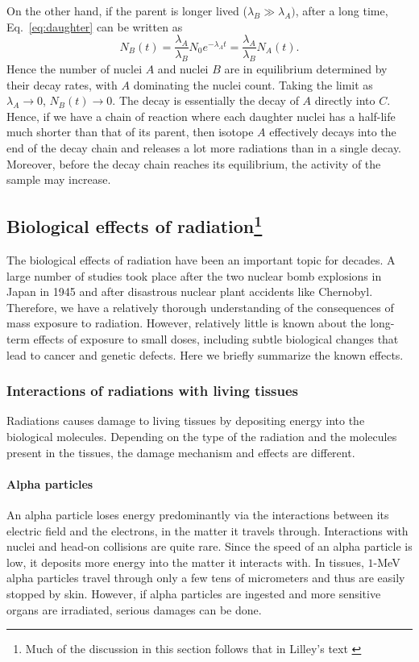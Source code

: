 \documentclass[nofootinbib,preprint,aps]{revtex4-1}
\begin{document}
        On the other hand, if the parent is longer lived
        ($\lambda_B \gg \lambda_A)$, after a long time, Eq.~\ref{eq:daughter} can be written as
        \begin{equation}
            N_B(t)=\frac{\lambda_A}{\lambda_B}N_0 e^{-\lambda_A t}=\frac{\lambda_A}{\lambda_B}N_A(t).
        \end{equation}
        Hence the number of nuclei $A$ and nuclei $B$ are in equilibrium determined by their decay rates, with
        $A$ dominating the nuclei count. Taking the limit as $\lambda_A \rightarrow 0$, $N_B(t)\rightarrow 0$.
        The decay is essentially the decay of $A$ directly into $C$. Hence, if we have a chain of reaction
        where each daughter nuclei has a half-life much shorter than that of its parent, then 
        isotope $A$ effectively decays into the end of the decay chain and releases a lot more radiations than
        in a single decay. Moreover, before the decay chain reaches its equilibrium, the activity of the sample
        may increase.

        \subsection{Biological effects of radiation\footnote{Much of the discussion in this section follows that in
        Lilley's text \cite[chapt. 7]{l01}}}
        The biological effects of radiation have been an important topic for decades. A large
        number of studies took place after the two nuclear bomb explosions in Japan in 1945
        and after disastrous nuclear plant accidents like Chernobyl. Therefore, we have a relatively
        thorough understanding of the consequences of mass exposure to radiation. However, relatively
        little is known about the long-term effects of exposure to small doses, including subtle biological
        changes that lead to cancer and genetic defects. Here we briefly summarize the known effects.
        \subsubsection{Interactions of radiations with living tissues}
        \label{sec:interactions}
        Radiations causes damage to living tissues by depositing energy into the biological molecules.
        Depending on the type of the radiation
        and the molecules present in the tissues, the damage mechanism and effects are different.
        \paragraph{Alpha particles} An alpha particle loses energy predominantly via the interactions between its electric
        field and the electrons, in the matter it travels through. Interactions with nuclei and head-on collisions
        are quite rare. Since the speed of an alpha particle is low, it deposits more energy into the matter it
        interacts with. In tissues, $1$-MeV alpha particles travel through only a few tens of micrometers and thus
        are easily stopped by skin. However, if alpha particles are ingested and more sensitive organs are irradiated,
        serious damages can be done.
\end{document}
